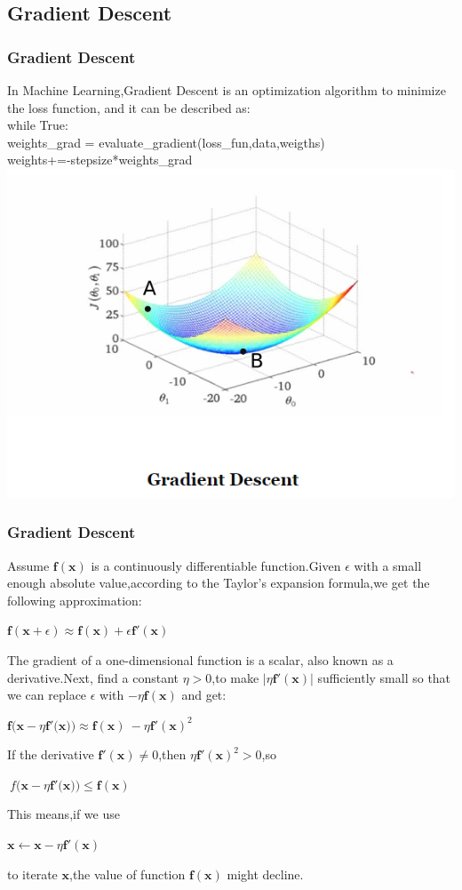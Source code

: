 \documentclass[cjk]{beamer}
\begin{document}
\subsection{Gradient Descent}
\begin{frame}
\frametitle{Gradient Descent}
In Machine Learning,Gradient Descent is an optimization algorithm to minimize the loss function,
and it can be described as:\\
while True:\\
weights\_grad = evaluate\_gradient(loss\_fun,data,weigths)\\
weights+=-stepsize*weights\_grad
\includegraphics[width =.9 \textwidth,height=.48\textheight]{GD.png}
\end{frame}

\begin{frame}
\frametitle{Gradient Descent}
Assume $\mathbf{f}(\mathbf{x})$ is a continuously differentiable function.Given $\epsilon$ with a small enough absolute value,according to the Taylor's expansion formula,we get the following approximation:\\
\centerline{$\mathbf{f}(\mathbf{x}+\epsilon)\approx\mathbf{f}(\mathbf{x})+\epsilon\mathbf{f}'(\mathbf{x})$}
The gradient of a one-dimensional function is a scalar, also known as a derivative.Next, find a constant
$\eta>0$,to make $|\eta\mathbf{f}'(\mathbf{x})|$ sufficiently small so that we can replace $\epsilon$ with 
$-\eta\mathbf{f}(\mathbf{x})$ and get:\\
\centerline{$\mathbf{f}\Big(\mathbf{x}-\eta\mathbf{f}'\big(\mathbf{x}\big)\Big)\approx\mathbf{f}(\mathbf{x})\
-\eta\mathbf{f}'(\mathbf{x})^2$}
If the derivative $\mathbf{f}'(\mathbf{x})\neq0$,then $\eta\mathbf{f}'(\mathbf{x})^2>0$,so\\
\centerline{$\mathbf\
{f}\Big(\mathbf{x}-\eta\mathbf{f}'\big(\mathbf{x}\big)\Big)\leq\mathbf{f}(\mathbf{x})$}
This means,if we use\\
\centerline{$\mathbf{x}\leftarrow\mathbf{x}-\eta\mathbf{f}'(\mathbf{x})$}
to iterate $\mathbf{x}$,the value of function $\mathbf{f}(\mathbf{x})$ might decline.
\end{frame}
\end{document}
